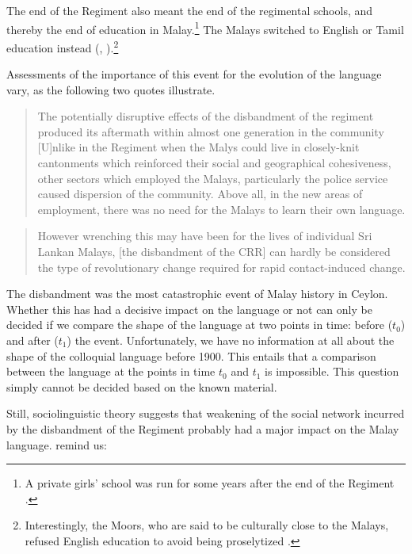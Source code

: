 The end of the Regiment also meant the end of the regimental schools, and thereby the end of education in Malay.\footnote{A private girls' school was run for some years after the end of the Regiment \citep[102]{Hussainmiya1987}.} The Malays switched to English or Tamil education instead (\citet[88]{Hussainmiya1987}, \citet[14]{Saldin2003}).\footnote{Interestingly, the Moors, who are said to be culturally close to the Malays, refused English education to avoid being proselytized \citep[57]{Nuhman2007}.}
 
Assessments of the importance of this event for the evolution of the language vary, as the following two quotes illustrate.

\begin{quote}
The potentially disruptive effects of the disbandment of the regiment produced its aftermath within almost one generation in the community \el{} [U]nlike in the Regiment when the Malys could live in closely-knit cantonments which reinforced their social and geographical cohesiveness, other sectors which employed the Malays, particularly the police service caused dispersion of the community. Above all, in the new areas of employment, there was no need for the Malays to learn their own language. \citep[155]{Hussainmiya1990}
\end{quote}

\noindent
\begin{quotation}
    However wrenching this may have been for the lives of individual Sri Lankan Malays, [the disbandment of the CRR] can hardly be considered the type of revolutionary change required for rapid contact-induced change. \citep[19]{SmithRH}
\end{quotation}

The disbandment was the most catastrophic event of Malay history in Ceylon.   Whether this has had a decisive impact on the language or not can only be decided if  we compare the shape of the language at two points in time: before ($t_0$) and after ($t_1$) the event. Unfortunately, we have no information at all about the shape of the colloquial language before 1900. This entails that a comparison between the language at the points in time $t_0$ and $t_1$ is impossible. This question simply cannot be decided based on the known material.

Still, sociolinguistic theory suggests that  weakening of the social network incurred by the disbandment of the Regiment probably had a major impact on the Malay language. \citet[124]{MilroyEtAl2003} remind us:

